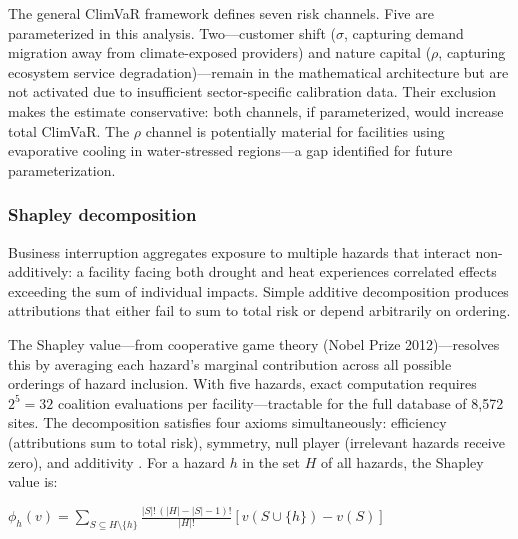 \clearpage\thispagestyle{chapterstart}

\vspace{2mm}


\begin{twocolbody}

\noindent The general ClimVaR framework defines seven risk channels. Five are parameterized in this analysis. Two---customer shift ($\sigma$, capturing demand migration away from climate-exposed providers) and nature capital ($\rho$, capturing ecosystem service degradation)---remain in the mathematical architecture but are not activated due to insufficient sector-specific calibration data. Their exclusion makes the estimate conservative: both channels, if parameterized, would increase total ClimVaR. The $\rho$ channel is potentially material for facilities using evaporative cooling in water-stressed regions---a gap identified for future parameterization.

\subsubsection*{Shapley decomposition}\label{toc:shapley}

Business interruption aggregates exposure to multiple hazards that interact non-additively: a facility facing both drought and heat experiences correlated effects exceeding the sum of individual impacts. Simple additive decomposition produces attributions that either fail to sum to total risk or depend arbitrarily on ordering.

The Shapley value---from cooperative game theory (Nobel Prize 2012)---resolves this by averaging each hazard's marginal contribution across all possible orderings of hazard inclusion. With five hazards, exact computation requires $2^5 = 32$ coalition evaluations per facility---tractable for the full database of 8,572 sites. The decomposition satisfies four axioms simultaneously: efficiency (attributions sum to total risk), symmetry, null player (irrelevant hazards receive zero), and additivity \citep{shapley1953}. For a hazard $h$ in the set $H$ of all hazards, the Shapley value is:

\vspace{1mm}
\begin{center}
$\phi_h(v) = \displaystyle\sum_{S \subseteq H \setminus \{h\}} \frac{|S|!\,(|H|-|S|-1)!}{|H|!} \left[ v(S \cup \{h\}) - v(S) \right]$
\end{center}
\vspace{1mm}


\end{twocolbody}
